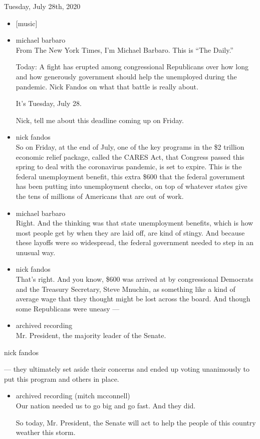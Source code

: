 Tuesday, July 28th, 2020

\begin{itemize}
\item
  {[}music{]}
\item
  michael barbaro\\
  From The New York Times, I'm Michael Barbaro. This is ``The Daily.''

  Today: A fight has erupted among congressional Republicans over how
  long and how generously government should help the unemployed during
  the pandemic. Nick Fandos on what that battle is really about.

  It's Tuesday, July 28.

  Nick, tell me about this deadline coming up on Friday.
\item
  nick fandos\\
  So on Friday, at the end of July, one of the key programs in the \$2
  trillion economic relief package, called the CARES Act, that Congress
  passed this spring to deal with the coronavirus pandemic, is set to
  expire. This is the federal unemployment benefit, this extra \$600
  that the federal government has been putting into unemployment checks,
  on top of whatever states give the tens of millions of Americans that
  are out of work.
\item
  michael barbaro\\
  Right. And the thinking was that state unemployment benefits, which is
  how most people get by when they are laid off, are kind of stingy. And
  because these layoffs were so widespread, the federal government
  needed to step in an unusual way.
\item
  nick fandos\\
  That's right. And you know, \$600 was arrived at by congressional
  Democrats and the Treasury Secretary, Steve Mnuchin, as something like
  a kind of average wage that they thought might be lost across the
  board. And though some Republicans were uneasy ---
\item
  archived recording\\
  Mr. President, the majority leader of the Senate.
\end{itemize}

nick fandos

--- they ultimately set aside their concerns and ended up voting
unanimously to put this program and others in place.

\begin{itemize}
\item
  archived recording (mitch mcconnell)\\
  Our nation needed us to go big and go fast. And they did.

  So today, Mr. President, the Senate will act to help the people of
  this country weather this storm.
\end{itemize}


